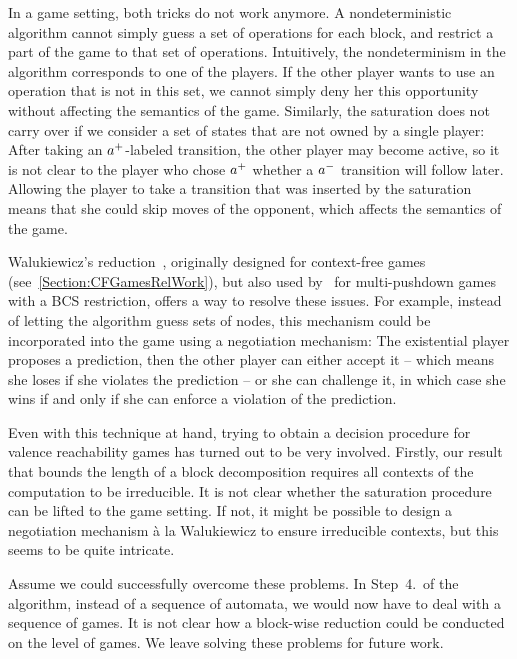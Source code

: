 \documentclass[../../diss.tex]{subfiles}
\begin{document}
In a game setting, both tricks do not work anymore.
A nondeterministic algorithm cannot simply guess a set of operations for each block, and restrict a part of the game to that set of operations.
Intuitively, the nondeterminism in the algorithm corresponds to one of the players.
If the other player wants to use an operation that is not in this set, we cannot simply deny her this opportunity without affecting the semantics of the game.
Similarly, the saturation does not carry over if we consider a set of states that are not owned by a single player:
After taking an ${a}^+$-labeled transition, the other player may become active, so it is not clear to the player who chose ${a}^+$ whether a ${a}^-$ transition will follow later.
Allowing the player to take a transition that was inserted by the saturation means that she could skip moves of the opponent, which affects the semantics of the game.

Walukiewicz's reduction~\cite{Walukiewicz01}, originally designed for context-free games (see~\cref{Section:CFGamesRelWork}), but also used by~ for multi-pushdown games with a BCS restriction, offers a way to resolve these issues.
For example, instead of letting the algorithm guess sets of nodes, this mechanism could be incorporated into the game using a negotiation mechanism:
The existential player proposes a prediction, then the other player can either accept it -- which means she loses if she violates the prediction -- or she can challenge it, in which case she wins if and only if she can enforce a violation of the prediction.

Even with this technique at hand, trying to obtain a decision procedure for valence reachability games has turned out to be very involved.
Firstly, our result that bounds the length of a block decomposition requires all contexts of the computation to be irreducible.
It is not clear whether the saturation procedure can be lifted to the game setting.
If not, it might be possible to design a negotiation mechanism à la Walukiewicz to ensure irreducible contexts, but this seems to be quite intricate.

Assume we could successfully overcome these problems.
In Step~4.~of the algorithm, instead of a sequence of automata, we would now have to deal with a sequence of games.
It is not clear how a block-wise reduction could be conducted on the level of games.
We leave solving these problems for future work.
\end{document}
